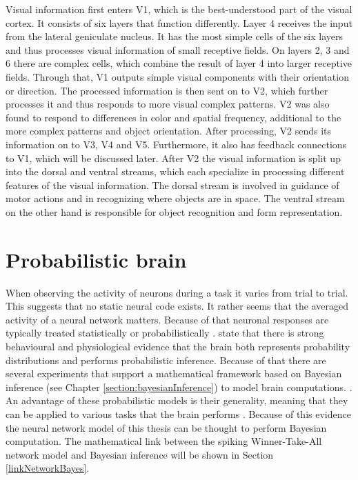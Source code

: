 Visual information first enters V1, which is the best-understood part of the visual cortex. It consists of six layers that function differently. Layer 4 receives the input from the lateral geniculate nucleus. It has the most simple cells of the six layers and thus processes visual information of small receptive fields. On layers 2, 3 and 6 there are complex cells, which combine the result of layer 4 into larger receptive fields. Through that, V1 outputs simple visual components with their orientation or direction. The processed information is then sent on to V2, which further processes it and thus responds to more visual complex patterns. V2 was also found to respond to differences in color and spatial frequency, additional to the more complex patterns and object orientation. After processing, V2 sends its information on to V3, V4 and V5. Furthermore, it also has feedback connections to V1, which will be discussed later. After V2 the visual information is split up into the dorsal and ventral streams, which each specialize in processing different features of the visual information. The dorsal stream is involved in guidance of motor actions and in recognizing where objects are in space. The ventral stream on the other hand is responsible for object recognition and form representation.
\citep{visualCortexBook}

\section{Probabilistic brain}
\label{sec:probabilisticBrain}

When observing the activity of neurons during a task it varies from trial to trial. This suggests that no static neural code exists. It rather seems that the averaged activity of a neural network matters. Because of that neuronal responses are typically treated statistically or probabilistically \citep{SpikingNeuronModelsBook}.  \citet{probabilisticBrain} state that there is strong behavioural and physiological evidence that the brain both represents probability distributions and performs probabilistic inference. Because of that there are several experiments that support a mathematical framework based on Bayesian inference (see Chapter \ref{section:bayesianInference}) to model brain computations. \citep{neuralSubstrate, HierachicalBayesVisualCortex, anatomyOfInference, neuralImplementationOfBayesionInferenceSensoryMotor}. An advantage of these probabilistic models is their generality, meaning that they can be applied to various tasks that the brain performs \citep{probabilisticBrain}. Because of this evidence the neural network model of this thesis can be thought to perform Bayesian computation. The mathematical link between the spiking Winner-Take-All network model and Bayesian inference will be shown in Section \ref{linkNetworkBayes}.

